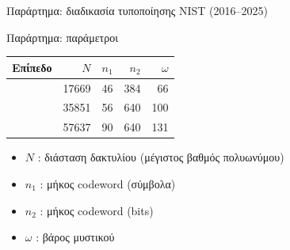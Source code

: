 \begin{frame}{Παράρτημα: διαδικασία τυποποίησης NIST (2016--2025)}
  \centering
  \resizebox{0.9\linewidth}{!}{}
\end{frame}

\begin{frame}{Παράρτημα: παράμετροι \HQC}
  \centering
  \renewcommand{\arraystretch}{1.2}
  {\small
  \begin{tabular}{@{}lrrrr@{}}
    \toprule
    Επίπεδο & $N$ & $n_1$ & $n_2$ & $\omega$ \\
    \midrule
    \HQC-128 & \num{17669} & 46 & 384 & 66 \\
    \HQC-192 & \num{35851} & 56 & 640 & 100 \\
    \HQC-256 & \num{57637} & 90 & 640 & 131 \\
    \bottomrule
  \end{tabular}}
  \par\medskip
  \begin{minipage}{0.86\textwidth}
    \begin{itemize}
      \item $N$ : διάσταση δακτυλίου (μέγιστος βαθμός πολυωνύμου)
      \item $n_1$ : μήκος  codeword (σύμβολα)
      \item $n_2$ : μήκος  codeword (bits)
      \item $\omega$ : βάρος  μυστικού
    \end{itemize}
  \end{minipage}
\end{frame}

